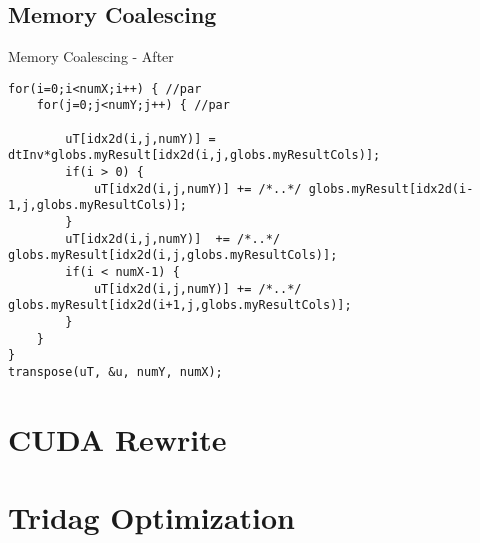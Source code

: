 \documentclass[xcolor=x11names,compress]{beamer}
\begin{document}
\subsection{Memory Coalescing}
\begin{frame}[fragile]{Memory Coalescing - After}
\begin{verbatim}
for(i=0;i<numX;i++) { //par
    for(j=0;j<numY;j++) { //par

        uT[idx2d(i,j,numY)] = dtInv*globs.myResult[idx2d(i,j,globs.myResultCols)];
        if(i > 0) {
            uT[idx2d(i,j,numY)] += /*..*/ globs.myResult[idx2d(i-1,j,globs.myResultCols)];
        }
        uT[idx2d(i,j,numY)]  += /*..*/ globs.myResult[idx2d(i,j,globs.myResultCols)];
        if(i < numX-1) {
            uT[idx2d(i,j,numY)] += /*..*/ globs.myResult[idx2d(i+1,j,globs.myResultCols)];
        }
    }
}
transpose(uT, &u, numY, numX);
\end{verbatim}
\end{frame}

\section{CUDA Rewrite}

\section{Tridag Optimization}
\end{document}
